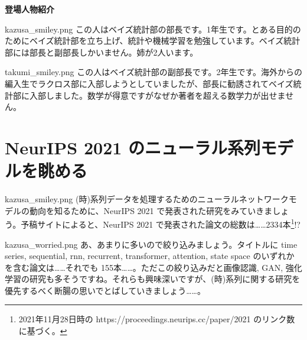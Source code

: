 \documentclass[b5paper,xelatex,ja=standard,10pt]{bxjsarticle}
\begin{document}
\vspace{6pt}
\centerline{\textbf{登場人物紹介}}

\vspace{3pt}
\begin{SERIFU}[colback=White, colbacktitle=PaleIris2, top=-1pt, bottom=0pt, left=18pt, right=10pt]{kazusa_smiley.png}
\small
この人はベイズ統計部の部長です。1年生です。とある目的のためにベイズ統計部を立ち上げ、統計や機械学習を勉強しています。ベイズ統計部には部長と副部長しかいません。姉が2人います。
\end{SERIFU}
\begin{SERIFU}[colback=White, colbacktitle=PaleGold2, top=-1pt, bottom=0pt, left=18pt, right=10pt]{takumi_smiley.png}
\small
この人はベイズ統計部の副部長です。2年生です。海外からの編入生でラクロス部に入部しようとしていましたが、部長に勧誘されてベイズ統計部に入部しました。数学が得意ですがなぜか著者を超える数学力が出せません。
\end{SERIFU}

\vspace{6pt}
\section*{NeurIPS 2021 のニューラル系列モデルを眺める}
\vspace{5pt}

\begin{SERIFU}[colback=PaleIris, colbacktitle=PaleIris2]{kazusa_smiley.png}
(時)系列データを処理するためのニューラルネットワークモデルの動向を知るために、NeurIPS 2021 で発表された研究をみていきましょう。予稿サイトによると、NeurIPS 2021 で発表された論文の総数は……2334本\footnote{2021年11月28日時の https://proceedings.neurips.cc/paper/2021 のリンク数に基づく。}!?
\end{SERIFU}

\begin{SERIFU}[colback=PaleIris, colbacktitle=PaleIris2]{kazusa_worried.png}
あ、あまりに多いので絞り込みましょう。タイトルに time series, sequential, rnn, recurrent, transformer, attention, state space のいずれかを含む論文は……それでも 155本……。ただこの絞り込みだと画像認識, GAN, 強化学習の研究も多そうですね。それらも興味深いですが、(時)系列に関する研究を優先するべく断腸の思いでとばしていきましょう……。
\end{SERIFU}
\end{document}
